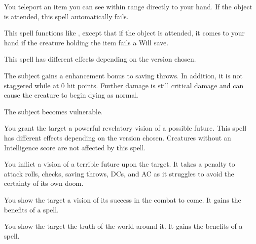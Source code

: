 \spellrng{\rngclose}
\begin{spelleffect}
  You teleport an item you can see within range directly to your hand. If the object is attended, this spell automatically fails.
\end{spelleffect}

\spellrng{\rngmed}
\begin{spelleffect}
  This spell functions like , except that if the object is attended, it comes to your hand if the creature holding the item fails a Will save.
\end{spelleffect}

\spellrng{\rngmed}
\spelldur{\durshort}
\begin{spelleffect}
    This spell has different effects depending on the version chosen.
    \par {} The subject gains a  enhancement bonus to saving throws. In addition, it is not staggered while at 0 hit points. Further damage is still critical damage and can cause the creature to begin dying as normal. 
    \par {} The subject becomes vulnerable.
\end{spelleffect}
\begin{spellnotes}
  \vulnerableexplanation
\end{spellnotes}

\spellrng{\rngmed}
\spelldur{\durshort}
\begin{spelleffect}
  You grant the target a powerful revelatory vision of a possible future. This spell has different effects depending on the version chosen. Creatures without an Intelligence score are not affected by this spell.
  \par {} You inflict a vision of a terrible future upon the target. It takes a  penalty to attack rolls, checks, saving throws, DCs, and AC as it struggles to avoid the certainty of its own doom.
  \par {} You show the target a vision of its success in the combat to come. It gains the benefits of a  spell.
  \par {} You show the target the truth of the world around it. It gains the benefits of a  spell.
\end{spelleffect}

